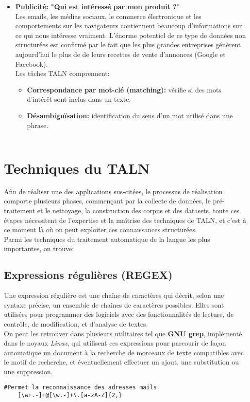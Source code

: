\documentclass{report}
\begin{document}
\begin{itemize}
    \item \textbf{Publicité: "Qui est intéressé par mon produit ?"}\\
    Les emails, les médias sociaux, le commerce électronique et les comportements sur les navigateurs contiennent beaucoup d'informations sur ce qui nous intéresse vraiment. L'énorme potentiel de ce type de données non structurées est confirmé par le fait que les plus grandes entreprises génèrent aujourd'hui le plus de de leurs recettes de vente d'annonces (Google et Facebook).\\ Les tâches TALN comprennent:
    \begin{itemize}
        \item \textbf{Correspondance par mot-clé (matching):} vérifie si des mots d'intérêt sont inclus dans un texte. 
        \item \textbf{Désambiguïsation:} identification du sens d'un mot utilisé dans une phrase.\\\\
    \end{itemize}
\end{itemize}

    
\section{Techniques du TALN}
Afin de réaliser une des applications sus-citées, le processus de réalisation comporte plusieurs phases, commençant par la collecte de données, le pré-traitement et le nettoyage, la construction des corpus et des datasets, toute ces étapes nécessitent de l'expertise et la maîtrise des techniques de TALN, et c'est à ce moment là où on peut exploiter ces connaissances structurées.\\
Parmi les techniques du traitement automatique de la langue les plus importantes, on trouve:

\subsection{Expressions régulières (REGEX)}
Une expression régulière est une chaîne de caractères qui décrit, selon une syntaxe précise, un ensemble de chaînes de caractères possibles. Elles sont utilisées pour programmer des logiciels avec des fonctionnalités de lecture, de contrôle, de modification, et d'analyse de textes.\\
On peut les retrouver dans plusieurs utilitaires tel que \textbf{GNU grep}, implémenté dans le noyaux \emph{Linux}, qui utilisent ces expressions pour parcourir de façon automatique un document à la recherche de morceaux de texte compatibles avec le motif de recherche, et éventuellement effectuer un ajout, une substitution ou une suppression.
\begin{lstlisting}[style=code]
    #Permet la reconnaissance des adresses mails
    [\w+.-]+@[\w.-]+\.[a-zA-Z]{2,}
\end{lstlisting}
\end{document}
